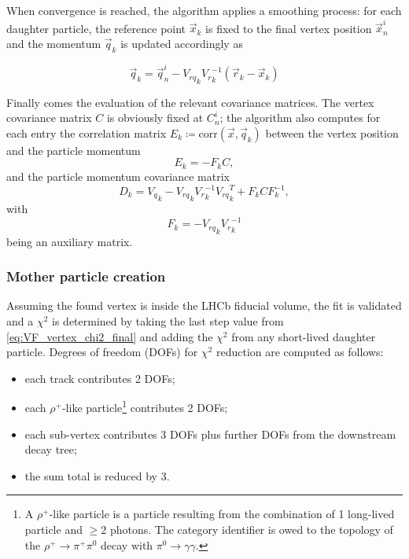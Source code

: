 When convergence is reached, the algorithm applies a smoothing process: for each daughter particle, the reference point $\vec{x}_k$ is fixed to the final vertex position $\vec{x}_n^{i}$ and the momentum $\vec{q}_k$ is updated accordingly as

\begin{equation}
	\vec{q}_k =
	\vec{q}_n^i
	-
	{V_{rq}}_k
	{V_r}_k^{-1}
	\left(
		\vec{r}_k - \vec{x}_k
	\right)
\end{equation}

Finally comes the evaluation of the relevant covariance matrices. The vertex covariance matrix $C$ is obviously fixed at $C_n^i$; the algorithm also computes for each entry the correlation matrix $E_k \coloneqq \text{corr}\left(\vec{x},\vec{q}_k\right)$ between the vertex position and the particle momentum
\begin{equation}
	E_k = - F_k C,
	\label{eq:Ek}
\end{equation}
and the particle momentum covariance matrix
\begin{equation}
	D_k =
	{V_q}_k
	-
	{V_{rq}}_k {V_r}_k^{-1} {V_{rq}}_k^T
	+
	F_k C F_k^{-1},
	\label{eq:Dk}
\end{equation}
with
\begin{equation}
	F_k =
	- {V_{rq}}_k {V_r}_k^{-1}
	\label{eq:Fk}
\end{equation}
being an auxiliary matrix.

\subsubsection{Mother particle creation}
Assuming the found vertex is inside the LHCb fiducial volume, the fit is validated and a $\chi^2$ is determined by taking the last step value from \eqref{eq:VF_vertex_chi2_final} and adding the $\chi^2$ from any short-lived daughter particle.
Degrees of freedom (DOFs) for $\chi^2$ reduction are computed as follows:
\begin{itemize}
	\item each track contributes 2 DOFs;
	\item each $\rho^+$-like particle\footnote{A $\rho^+$-like particle is a particle resulting from the combination of 1 long-lived particle and $\geq 2$ photons. The category identifier is owed to the topology of the $\rho^+ \rightarrow \pi^+\pi^0$ decay with $\pi^0 \rightarrow \gamma \gamma$.} contributes 2 DOFs;
	\item each sub-vertex contributes 3 DOFs plus further DOFs from the downstream decay tree;
	\item the sum total is reduced by 3. %
\end{itemize}

